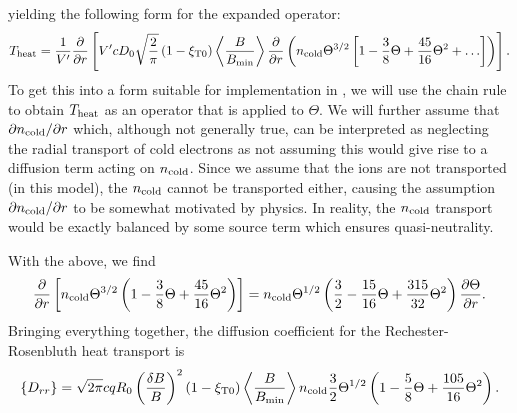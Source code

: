 \documentclass{notes}
\newcommand{\ncold}{n_{\rm cold}}
\newcommand{\VpVol}{V'}
\begin{document}
    yielding the following form for the expanded operator:
    \begin{equation}
        T_{\rm heat} = \frac{1}{\VpVol}\frac{\partial}{\partial r}\left[
            \VpVol cD_0\sqrt{\frac{2}{\pi}}\left(1-\xi_{\rm T0}\right)\left\langle\frac{B}{B_{\rm min}} \right\rangle
            \frac{\partial}{\partial r}\left( 
                \ncold \Theta^{3/2}\left[ 1 - \frac{3}{8}\Theta + \frac{45}{16}\Theta^2 + \ldots \right]
            \right)
        \right].
    \end{equation}
    To get this into a form suitable for implementation in \DREAM, we will use
    the chain rule to obtain $T_{\rm heat}$ as an operator that is applied to
    $\Theta$. We will further assume that $\partial\ncold/\partial r$ which,
    although not generally true, can be interpreted as neglecting the radial
    transport of cold electrons as not assuming this would give rise to a
    diffusion term acting on $\ncold$. Since we assume that the ions are not
    transported (in this model), the $\ncold$ cannot be transported either,
    causing the assumption $\partial\ncold/\partial r$ to be somewhat motivated
    by physics. In reality, the $\ncold$ transport would be exactly balanced by
    some source term which ensures quasi-neutrality.

    With the above, we find
    \begin{equation}
        \frac{\partial}{\partial r}\left[ \ncold\Theta^{3/2} \left(
            1 - \frac{3}{8}\Theta + \frac{45}{16}\Theta^2
        \right)\right] =
        \ncold\Theta^{1/2}\left( \frac{3}{2} - \frac{15}{16}\Theta + \frac{315}{32}\Theta^2 \right)
        \frac{\partial\Theta}{\partial r}.
    \end{equation}
    Bringing everything together, the diffusion coefficient for the
    Rechester-Rosenbluth heat transport is
    \begin{equation}
        \left\{ D_{rr} \right\} =
        \sqrt{2\pi}cqR_0\left(\frac{\delta B}{B}\right)^2\left(1-\xi_{\rm T0}\right)
        \left\langle\frac{B}{B_{\rm min}}\right\rangle\ncold
        \frac{3}{2}\Theta^{1/2}\left( 1 - \frac{5}{8}\Theta + \frac{105}{16}\Theta^2 \right).
    \end{equation}
\end{document}

